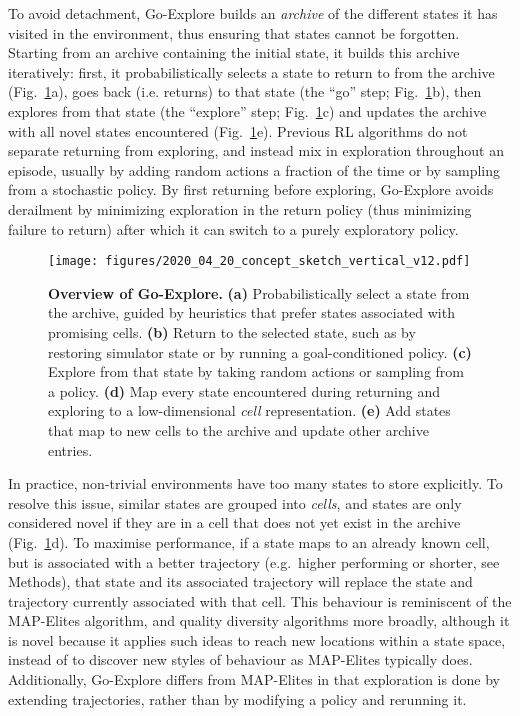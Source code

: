 \documentclass{nature}
\renewcommand*{\cite}[1]{\supercite{#1}}
\begin{document}
To avoid detachment, Go-Explore builds an \emph{archive} of the different states it has visited in the environment, thus ensuring that states cannot be forgotten. 
Starting from an archive containing the initial state, it builds this archive iteratively: first, it probabilistically selects a state to return to from the archive (Fig.~\ref{fig:concept_sketch}a), goes back (i.e. returns) to that state (the ``go'' step; Fig.~\ref{fig:concept_sketch}b), then explores from that state (the ``explore'' step; Fig.~\ref{fig:concept_sketch}c) and updates the archive with all novel states encountered (Fig.~\ref{fig:concept_sketch}e).
 Previous RL algorithms do not separate returning from exploring, and instead mix in exploration throughout an episode, usually by adding random actions a fraction of the time\cite{mnih:nature15,sutton1998reinforcement} or by sampling from a stochastic policy\cite{mnih2016asynchronous,Schulman2017ProximalPO}.
 By first returning before exploring, Go-Explore avoids derailment by minimizing exploration in the return policy (thus minimizing failure to return) after which it can switch to a purely exploratory policy. 

\begin{figure}[tbp!]
    \centering
    \texttt{[image: figures/2020\_04\_20\_concept\_sketch\_vertical\_v12.pdf]}
    \caption{\textbf{Overview of Go-Explore.} \textbf{(a)} Probabilistically select a state from the archive, guided by heuristics that prefer states associated with promising cells. \textbf{(b)} Return to the selected state, such as by restoring simulator state or by running a goal-conditioned policy. \textbf{(c)} Explore from that state by taking random actions or sampling from a policy. \textbf{(d)} Map every state encountered during returning and exploring to a low-dimensional \emph{cell} representation. \textbf{(e)} Add states that map to new cells to the archive and update other archive entries.}
    \label{fig:concept_sketch}
\end{figure}

In practice, non-trivial environments have too many states to store explicitly.
To resolve this issue, similar states are grouped into \emph{cells}, and states are only considered novel if they are in a cell that does not yet exist in the archive (Fig.~\ref{fig:concept_sketch}d).
To maximise performance, if a state maps to an already known cell, but is associated with a better trajectory (e.g.\ higher performing or shorter, see Methods), that state and its associated trajectory will replace the state and trajectory currently associated with that cell. 
This behaviour is reminiscent of the MAP-Elites algorithm\cite{mouret2015illuminating}, and quality diversity algorithms more broadly\cite{lehman:gecco11,pugh:frontiers16}, although it is novel because it applies such ideas to reach new locations within a state space, instead of to discover new styles of behaviour as MAP-Elites typically does. 
Additionally, Go-Explore differs from MAP-Elites in that exploration is done by extending trajectories, rather than by modifying a policy and rerunning it.
\end{document}

